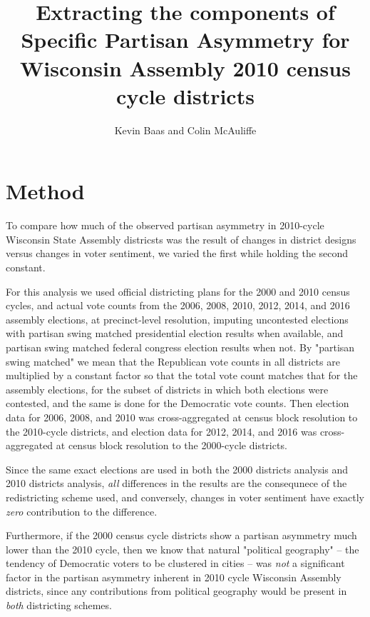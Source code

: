 \documentclass[preprint,12pt]{article}
\begin{document}
\title{Extracting the components of Specific Partisan Asymmetry for Wisconsin Assembly 2010 census cycle districts}
\author{Kevin Baas and Colin McAuliffe}
\maketitle

\section{Method}

To compare how much of the observed partisan asymmetry in 2010-cycle Wisconsin State Assembly districsts was the result of changes in district designs versus changes in voter sentiment, we varied the first while holding the second constant.

For this analysis we used official districting plans for the 2000 and 2010 census cycles, and actual vote counts from the 2006, 2008, 2010, 2012, 2014, and 2016 assembly elections, at precinct-level resolution, imputing uncontested elections with partisan swing matched presidential election results when available, and partisan swing matched federal congress election results when not.
By "partisan swing matched" we mean that the Republican vote counts in all districts are multiplied by a constant factor so that the total vote count matches that for the assembly elections, for the subset of districts in which both elections were contested, and the same is done for the Democratic vote counts.
Then election data for 2006, 2008, and 2010 was cross-aggregated at census block resolution to the 2010-cycle districts, and election data for 2012, 2014, and 2016 was cross-aggregated at census block resolution to the 2000-cycle districts. 
 
Since the same exact elections are used in both the 2000 districts analysis and 2010 districts analysis, \emph{all} differences in the results are the consequnece of the redistricting scheme used, and conversely, changes in voter sentiment have exactly \emph{zero} contribution to the difference.

Furthermore, if the 2000 census cycle districts show a partisan asymmetry much lower than the 2010 cycle, then we know that natural "political geography" -- the tendency of Democratic voters to be clustered in cities -- was \emph{not} a significant factor in the partisan asymmetry inherent in 2010 cycle Wisconsin Assembly districts, since any contributions from political geography would be present in \emph{both} districting schemes.
\end{document}
